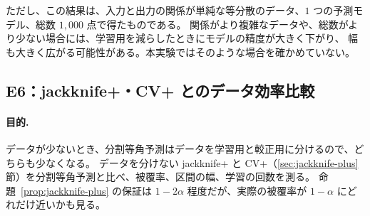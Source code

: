 \documentclass[a4paper,11pt]{jsarticle}
\theoremstyle{definition}
\theoremstyle{plain}
\theoremstyle{remark}
\begin{document}
ただし、この結果は、入力と出力の関係が単純な等分散のデータ、$1$ つの予測モデル、総数 $1{,}000$ 点で得たものである。
関係がより複雑なデータや、総数がより少ない場合には、学習用を減らしたときにモデルの精度が大きく下がり、
幅も大きく広がる可能性がある。本実験ではそのような場合を確かめていない。


\subsection{E6：jackknife+・CV+ とのデータ効率比較}
\label{sec:e6}

\paragraph{目的.}
データが少ないとき、分割等角予測はデータを学習用と較正用に分けるので、どちらも少なくなる。
データを分けない jackknife+ と CV+（\ref{sec:jackknife-plus}節）を分割等角予測と比べ、被覆率、区間の幅、学習の回数を測る。
命題~\ref{prop:jackknife-plus} の保証は $1-2\alpha$ 程度だが、実際の被覆率が $1-\alpha$ にどれだけ近いかも見る。
\end{document}
